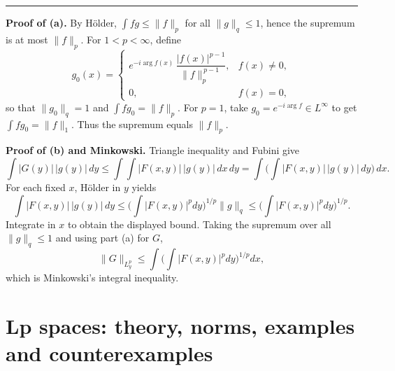 \documentclass[12pt,a4paper]{article}
\theoremstyle{plain}
\theoremstyle{definition}
\theoremstyle{remark}
\theoremstyle{remark}
\newcommand{\tighthrule}{\vspace{0.6\baselineskip}\hrule\vspace{0.8\baselineskip}}
\newenvironment{spacy}{\begingroup\setlength{\parskip}{6pt}\setlength{\parindent}{0pt}}{\endgroup}
\theoremstyle{definition}
\begin{document}
\tighthrule
\begin{spacy}
	\textbf{Proof of (a).}
	By Hölder, $\int f g \le \|f\|_{p}$ for all $\|g\|_{q}\le1$, hence the supremum is at most $\|f\|_{p}$.
	For $1<p<\infty$, define
	\[
	g_0(x)=
	\begin{cases}
		e^{-i\arg f(x)}\,\dfrac{|f(x)|^{p-1}}{\|f\|_{p}^{\,p-1}}, & f(x)\neq0,\\[8pt]
		0,& f(x)=0,
	\end{cases}
	\]
	so that $\|g_0\|_{q}=1$ and $\int f g_0=\|f\|_{p}$.
	For $p=1$, take $g_0=e^{-i\arg f}\in L^{\infty}$ to get $\int f g_0=\|f\|_{1}$.
	Thus the supremum equals $\|f\|_{p}$.
	
	\medskip
	
	\textbf{Proof of (b) and Minkowski.}
	Triangle inequality and Fubini give
	\[
	\int |G(y)|\,|g(y)|\,dy
	\le \int \!\!\int |F(x,y)|\,|g(y)|\,dx\,dy
	= \int \Big(\int |F(x,y)|\,|g(y)|\,dy\Big)\,dx.
	\]
	For each fixed $x$, Hölder in $y$ yields
	\[
	\int |F(x,y)|\,|g(y)|\,dy \le
	\Big(\int |F(x,y)|^{p}dy\Big)^{1/p}\|g\|_{q}\le
	\Big(\int |F(x,y)|^{p}dy\Big)^{1/p}.
	\]
	Integrate in $x$ to obtain the displayed bound. Taking the supremum over all $\|g\|_{q}\le1$ and using part (a) for $G$,
	\[
	\|G\|_{L^{p}_y}
	\le \int \Big(\int |F(x,y)|^{p}dy\Big)^{1/p} dx,
	\]
	which is Minkowski’s integral inequality.
\end{spacy}

\section*{Lp spaces: theory, norms, examples and counterexamples}
\end{document}
